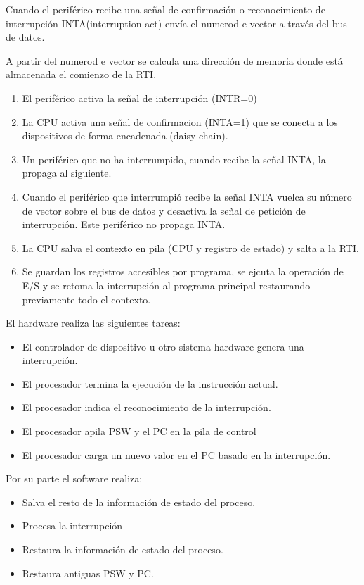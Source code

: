 \documentclass{article}
\begin{document}
				Cuando el periférico recibe una señal de confirmación o reconocimiento de interrupción INTA(interruption act) envía el numerod e vector a través del bus de datos.
				
				A partir del numerod e vector se calcula una dirección de memoria donde está almacenada el comienzo de la RTI.
				\begin{enumerate}
				\item El periférico activa la señal de interrupción (INTR=0)
				\item La CPU activa una señal de confirmacion (INTA=1) que se conecta a los dispositivos de forma encadenada (daisy-chain).
				\item Un periférico que no ha interrumpido, cuando recibe la señal INTA, la propaga al siguiente.
				\item Cuando el periférico que interrumpió recibe la señal INTA vuelca su número de vector sobre el bus de datos y desactiva la señal de petición de interrupción. Este periférico no propaga INTA.
				\item La CPU salva el contexto en pila (CPU y registro de estado) y salta a la RTI.
				\item Se guardan los registros accesibles por programa, se ejcuta la operación de E/S y se retoma la interrupción al programa principal restaurando previamente todo el contexto.
				\end{enumerate}
				
				El hardware realiza las siguientes tareas:
				
				\begin{itemize}
				\item El controlador de dispositivo u otro sistema hardware genera una interrupción.
				\item El procesador termina la ejecución de la instrucción actual.
				\item El procesador indica el reconocimiento de la interrupción.
				\item El procesador apila PSW y el PC en la pila de control 
				\item El procesador carga un nuevo valor en el PC basado en la interrupción.
				\end{itemize}
				
				Por su parte el software realiza:
				
				\begin{itemize}
				\item Salva el resto de la información de estado del proceso.
				\item Procesa la interrupción
				\item Restaura la información de estado del proceso.
				\item Restaura antiguas PSW y PC.
				\end{itemize}
				
\end{document}
